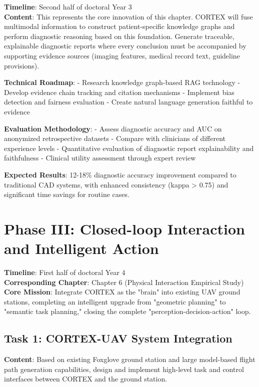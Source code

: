 \textbf{Timeline}: Second half of doctoral Year 3\\
\textbf{Content}: This represents the core innovation of this chapter. CORTEX will fuse multimodal information to construct patient-specific knowledge graphs and perform diagnostic reasoning based on this foundation. Generate traceable, explainable diagnostic reports where every conclusion must be accompanied by supporting evidence sources (imaging features, medical record text, guideline provisions).

\textbf{Technical Roadmap}: 
- Research knowledge graph-based RAG technology
- Develop evidence chain tracking and citation mechanisms
- Implement bias detection and fairness evaluation
- Create natural language generation faithful to evidence

\textbf{Evaluation Methodology}: 
- Assess diagnostic accuracy and AUC on anonymized retrospective datasets
- Compare with clinicians of different experience levels
- Quantitative evaluation of diagnostic report explainability and faithfulness
- Clinical utility assessment through expert review

\textbf{Expected Results}: 12-18\% diagnostic accuracy improvement compared to traditional CAD systems, with enhanced consistency (kappa > 0.75) and significant time savings for routine cases.

\section{Phase III: Closed-loop Interaction and Intelligent Action}

\textbf{Timeline}: First half of doctoral Year 4\\
\textbf{Corresponding Chapter}: Chapter 6 (Physical Interaction Empirical Study)\\
\textbf{Core Mission}: Integrate CORTEX as the "brain" into existing UAV ground stations, completing an intelligent upgrade from "geometric planning" to "semantic task planning," closing the complete "perception-decision-action" loop.

\subsection{Task 1: CORTEX-UAV System Integration}

\textbf{Content}: Based on existing Foxglove ground station and large model-based flight path generation capabilities, design and implement high-level task and control interfaces between CORTEX and the ground station.

